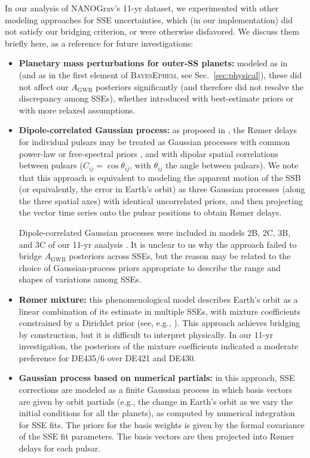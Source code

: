 \documentclass{aastex63}
\begin{document}
In our analysis of NANOGrav's 11-yr dataset, we experimented with other modeling approaches for SSE uncertainties, which (in our implementation) did not satisfy our bridging criterion, or were otherwise disfavored. We discuss them briefly here, as a reference for future investigations:
%
\begin{itemize} %
    \item \textbf{Planetary mass perturbations for outer-SS planets:} modeled as in \cite{2010ApJ...720L.201C} (and as in the first element of \textsc{BayesEphem}, see Sec.\ \ref{sec:physical}), these did not affect our $A_\mathrm{GWB}$ posteriors significantly (and therefore did not resolve the discrepancy among SSEs), whether introduced with best-estimate priors \citep{iaumasses} or with more relaxed assumptions.
    \item \textbf{Dipole-correlated Gaussian process:}
    as proposed in \cite{2016MNRAS.455.4339T}, the R{\o}mer delays for individual pulsars may be treated as Gaussian processes with common power-law or free-spectral priors \citep{vhv14}, and with dipolar spatial correlations between pulsars ($C_{ij} = \cos \theta_{ij}$, with $\theta_{ij}$ the angle between pulsars).
    We note that this approach is equivalent to modeling the apparent motion of the SSB (or equivalently, the error in Earth's orbit) as three Gaussian processes (along the three spatial axes) with identical uncorrelated priors, and then projecting the vector time series onto the pulsar positions to obtain R{\o}mer delays.
    
    Dipole-correlated Gaussian processes were included in models 2B, 2C, 3B, and 3C of our 11-yr analysis \citep{2018ApJ...859...47A}.
    It is unclear to us why the approach failed to bridge $A_\mathrm{GWB}$ posteriors across SSEs, but the reason may be related to the choice of Gaussian-process priors appropriate to describe the range and shapes of variations among SSEs.
    \item \textbf{R{\o}mer mixture:} this phenomenological model describes Earth's orbit as a linear combination of its estimate in multiple SSEs, with mixture coefficients constrained by a Dirichlet prior (see, e.g., \citealt{gelman2013bayesian}). 
    This approach achieves bridging by construction, but it is difficult to interpret physically.
    In our 11-yr investigation, the posteriors of the mixture coefficients indicated a moderate preference for DE435/6 over DE421 and DE430.
    \item \textbf{Gaussian process based on numerical partials:} in this approach, SSE corrections are modeled as a finite Gaussian process \citep{williams2006gaussian} in which basis vectors are given by orbit partials (e.g., the change in Earth's orbit as we vary the initial conditions for all the planets), as computed by numerical integration for SSE fits. The priors for the basis weights is given by the formal covariance of the SSE fit parameters. The basis vectors are then projected into R{\o}mer delays for each pulsar.
    

\end{itemize}
\end{document}
